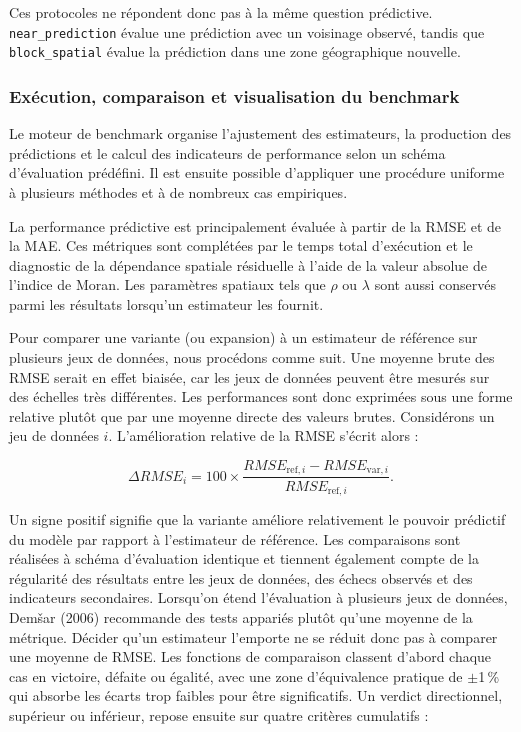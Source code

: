 \documentclass[11pt,a4paper]{article}
\begin{document}
Ces protocoles ne répondent donc pas à la même question prédictive. \texttt{near\_prediction} évalue une prédiction avec un voisinage observé, tandis que \texttt{block\_spatial} évalue la prédiction dans une zone géographique nouvelle.

\subsubsection{Exécution, comparaison et visualisation du benchmark}

Le moteur de benchmark organise l'ajustement des estimateurs, la production des prédictions et le calcul des indicateurs de performance selon un schéma d'évaluation prédéfini. Il est ensuite possible d'appliquer une procédure uniforme à plusieurs méthodes et à de nombreux cas empiriques.

La performance prédictive est principalement évaluée à partir de la RMSE et de la MAE. Ces métriques sont complétées par le temps total d'exécution et le diagnostic de la dépendance spatiale résiduelle à l'aide de la valeur absolue de l'indice de Moran. Les paramètres spatiaux tels que $\rho$ ou $\lambda$ sont aussi conservés parmi les résultats lorsqu'un estimateur les fournit.

Pour comparer une variante (ou expansion) à un estimateur de référence sur plusieurs jeux de données, nous procédons comme suit. Une moyenne brute des RMSE serait en effet biaisée, car les jeux de données peuvent être mesurés sur des échelles très différentes. Les performances sont donc exprimées sous une forme relative plutôt que par une moyenne directe des valeurs brutes. Considérons un jeu de données $i$. L'amélioration relative de la RMSE s'écrit alors :

\begin{equation}
    \Delta RMSE_i
    =
    100
    \times
    \frac{RMSE_{\mathrm{ref},i}-RMSE_{\mathrm{var},i}}
         {RMSE_{\mathrm{ref},i}}.
\end{equation}

Un signe positif signifie que la variante améliore relativement le pouvoir prédictif du modèle par rapport à l'estimateur de référence. Les comparaisons sont réalisées à schéma d'évaluation identique et tiennent également compte de la régularité des résultats entre les jeux de données, des échecs observés et des indicateurs secondaires. Lorsqu'on étend l'évaluation à plusieurs jeux de données, Demšar (2006) recommande des tests appariés plutôt qu'une moyenne de la métrique. Décider qu'un estimateur l'emporte ne se réduit donc pas à comparer une moyenne de RMSE. Les fonctions de comparaison classent d'abord chaque cas en victoire, défaite ou égalité, avec une zone d'équivalence pratique de $\pm$1\,\% qui absorbe les écarts trop faibles pour être significatifs. Un verdict directionnel, supérieur ou inférieur, repose ensuite sur quatre critères cumulatifs :
\end{document}
